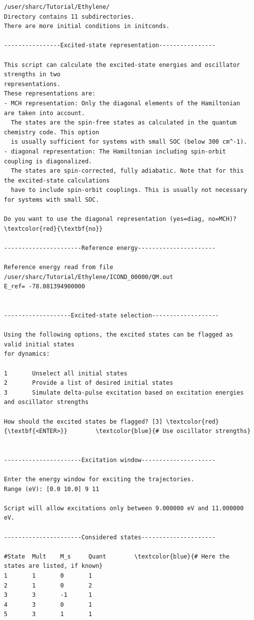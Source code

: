 \documentclass[a4paper,11pt,DIV=15,openany]{scrbook}
\begin{document}
\begin{oframed}
\begin{Verbatim}[commandchars=\\\{\}]
/user/sharc/Tutorial/Ethylene/
Directory contains 11 subdirectories.
There are more initial conditions in initconds.

----------------Excited-state representation----------------

This script can calculate the excited-state energies and oscillator strengths in two 
representations.
These representations are:
- MCH representation: Only the diagonal elements of the Hamiltonian are taken into account. 
  The states are the spin-free states as calculated in the quantum chemistry code. This option 
  is usually sufficient for systems with small SOC (below 300 cm^-1).
- diagonal representation: The Hamiltonian including spin-orbit coupling is diagonalized. 
  The states are spin-corrected, fully adiabatic. Note that for this the excited-state calculations 
  have to include spin-orbit couplings. This is usually not necessary for systems with small SOC.

Do you want to use the diagonal representation (yes=diag, no=MCH)? \textcolor{red}{\textbf{no}}

----------------------Reference energy----------------------

Reference energy read from file
/user/sharc/Tutorial/Ethylene/ICOND_00000/QM.out
E_ref= -78.081394900000


-------------------Excited-state selection-------------------

Using the following options, the excited states can be flagged as valid initial states 
for dynamics:

1       Unselect all initial states
2       Provide a list of desired initial states
3       Simulate delta-pulse excitation based on excitation energies and oscillator strengths

How should the excited states be flagged? [3] \textcolor{red}{\textbf{<ENTER>}}        \textcolor{blue}{# Use oscillator strengths}


----------------------Excitation window---------------------

Enter the energy window for exciting the trajectories.
Range (eV): [0.0 10.0] 9 11

Script will allow excitations only between 9.000000 eV and 11.000000 eV.

----------------------Considered states---------------------

#State  Mult    M_s     Quant        \textcolor{blue}{# Here the states are listed, if known}
1       1       0       1
2       1       0       2
3       3       -1      1
4       3       0       1
5       3       1       1


\end{Verbatim}
\end{oframed}
\end{document}
